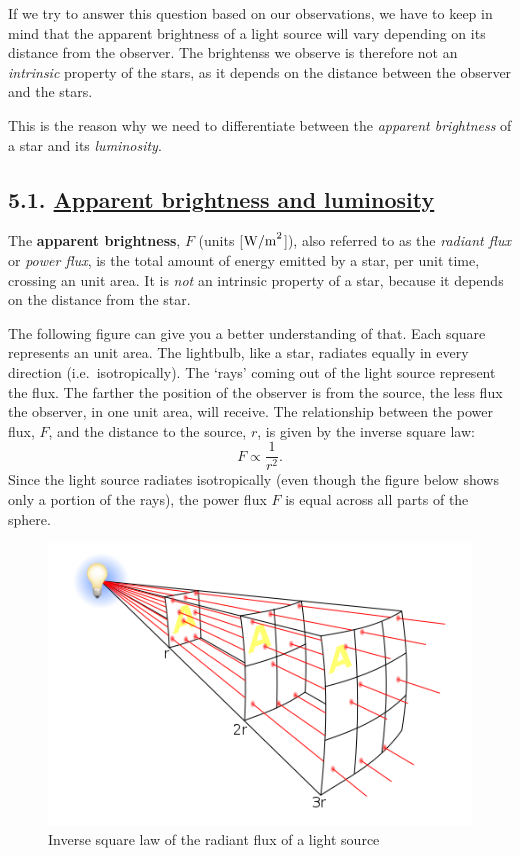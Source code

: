 \documentclass[
  letterpaper,
  DIV=11,
  numbers=noendperiod]{scrartcl}
\begin{document}
If we try to answer this question based on our observations, we have to
keep in mind that the apparent brightness of a light source will vary
depending on its distance from the observer. The brightenss we observe
is therefore not an \emph{intrinsic} property of the stars, as it
depends on the distance between the observer and the stars.

This is the reason why we need to differentiate between the
\emph{apparent brightness} of a star and its \emph{luminosity}.

\hypertarget{apparent-brightness-and-luminosity}{%
\subsection{\texorpdfstring{5.1. \protect\hyperlink{toc0_}{Apparent
brightness and
luminosity}}{5.1. Apparent brightness and luminosity}}\label{apparent-brightness-and-luminosity}}

The \textbf{apparent brightness}, \(F\) (units {[}\(\rm{W/m}^2\){]}),
also referred to as the \emph{radiant flux} or \emph{power flux}, is the
total amount of energy emitted by a star, per unit time, crossing an
unit area. It is \emph{not} an intrinsic property of a star, because it
depends on the distance from the star.

The following figure can give you a better understanding of that. Each
square represents an unit area. The lightbulb, like a star, radiates
equally in every direction (i.e.~isotropically). The `rays' coming out
of the light source represent the flux. The farther the position of the
observer is from the source, the less flux the observer, in one unit
area, will receive. The relationship between the power flux, \(F\), and
the distance to the source, \(r\), is given by the inverse square law:
\[F\propto \dfrac{1}{r^2}.\] Since the light source radiates
isotropically (even though the figure below shows only a portion of the
rays), the power flux \(F\) is equal across all parts of the sphere.

\begin{figure}

{\centering \includegraphics{img/inverse_square_law.png}

}

\caption{Inverse square law of the radiant flux of a light source}

\end{figure}
\end{document}
